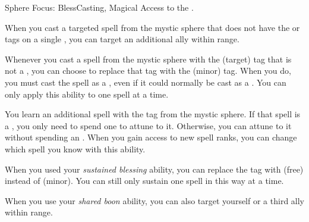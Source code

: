     \begin{feat}{Sphere Focus: Bless}{Casting, Magical}
        \featpre Access to the  .

         When you cast a targeted spell from the  mystic sphere that does not have the  or  tags on a single , you can target an additional ally within range.

         Whenever you cast a spell from the  mystic sphere with the  (target) tag that is not a , you can choose to replace that tag with the  (minor) tag.
        When you do, you must cast the spell as a , even if it could normally be cast as a .
        You can only apply this ability to one spell at a time.

         You learn an additional spell with the  tag from the  mystic sphere.
        If that spell is a , you only need to spend one  to attune to it.
        Otherwise, you can attune to it without spending an .
        When you gain access to new spell ranks, you can change which spell you know with this ability.

         When you used your \textit{sustained blessing} ability, you can replace the tag with  (free) instead of  (minor).
        You can still only sustain one spell in this way at a time.

         When you use your \textit{shared boon} ability, you can also target yourself or a third ally within range.
    \end{feat}

